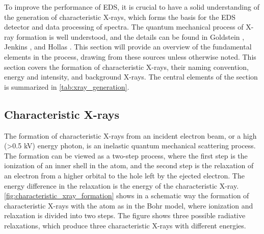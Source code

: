 To improve the performance of EDS, it is crucial to have a solid understanding of the generation of characteristic X-rays, which forms the basis for the EDS detector and data processing of spectra.
The quantum mechanical process of X-ray formation is well understood, and the details can be found in Goldstein \cite[Ch. 4.2]{goldstein_scanning_2018}, Jenkins \cite{jenkins_xrayspectroscopy}, and Hollas \cite[Ch. 8.2]{hollas_modern_2004}.
This section will provide an overview of the fundamental elements in the process, drawing from these sources unless otherwise noted.
This section covers the formation of characteristic X-rays, their naming convention, energy and intensity, and background X-rays.
The central elements of the section is summarized in \cref{tab:xray_generation}.




\subsection{Characteristic X-rays}
\label{theory:xray_formation:characteristic}

The formation of characteristic X-rays from an incident electron beam, or a high (>0.5 kV) energy photon, is an inelastic quantum mechanical scattering process.
The formation can be viewed as a two-step process, where the first step is the ionization of an inner shell in the atom, and the second step is the relaxation of an electron from a higher orbital to the hole left by the ejected electron.
The energy difference in the relaxation is the energy of the characteristic X-ray.
\cref{fig:characteristic_xray_formation} shows in a schematic way the formation of characteristic X-rays with the atom as in the Bohr model, where ionization and relaxation is divided into two steps.
The figure shows three possible radiative relaxations, which produce three characteristic X-rays with different energies.


